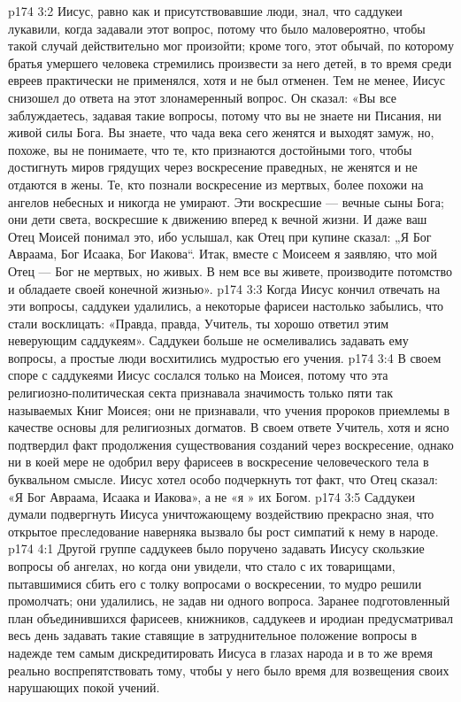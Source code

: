 \vs p174 3:2 Иисус, равно как и присутствовавшие люди, знал, что саддукеи лукавили, когда задавали этот вопрос, потому что было маловероятно, чтобы такой случай действительно мог произойти; кроме того, этот обычай, по которому братья умершего человека стремились произвести за него детей, в то время среди евреев практически не применялся, хотя и не был отменен. Тем не менее, Иисус снизошел до ответа на этот злонамеренный вопрос. Он сказал: «Вы все заблуждаетесь, задавая такие вопросы, потому что вы не знаете ни Писания, ни живой силы Бога. Вы знаете, что чада века сего женятся и выходят замуж, но, похоже, вы не понимаете, что те, кто признаются достойными того, чтобы достигнуть миров грядущих через воскресение праведных, не женятся и не отдаются в жены. Те, кто познали воскресение из мертвых, более похожи на ангелов небесных и никогда не умирают. Эти воскресшие --- вечные сыны Бога; они дети света, воскресшие к движению вперед к вечной жизни. И даже ваш Отец Моисей понимал это, ибо услышал, как Отец при купине сказал: „Я  Бог Авраама, Бог Исаака, Бог Иакова“. Итак, вместе с Моисеем я заявляю, что мой Отец --- Бог не мертвых, но живых. В нем все вы живете, производите потомство и обладаете своей конечной жизнью».
\vs p174 3:3 Когда Иисус кончил отвечать на эти вопросы, саддукеи удалились, а некоторые фарисеи настолько забылись, что стали восклицать: «Правда, правда, Учитель, ты хорошо ответил этим неверующим саддукеям». Саддукеи больше не осмеливались задавать ему вопросы, а простые люди восхитились мудростью его учения.
\vs p174 3:4 \pc В своем споре с саддукеями Иисус сослался только на Моисея, потому что эта религиозно\hyp{}политическая секта признавала значимость только пяти так называемых Книг Моисея; они не признавали, что учения пророков приемлемы в качестве основы для религиозных догматов. В своем ответе Учитель, хотя и ясно подтвердил факт продолжения существования созданий через воскресение, однако ни в коей мере не одобрил веру фарисеев в воскресение человеческого тела в буквальном смысле. Иисус хотел особо подчеркнуть тот факт, что Отец сказал: «Я  Бог Авраама, Исаака и Иакова», а не «я  » их Богом.
\vs p174 3:5 Саддукеи думали подвергнуть Иисуса уничтожающему воздействию  прекрасно зная, что открытое преследование наверняка вызвало бы рост симпатий к нему в народе.
\vs p174 4:1 Другой группе саддукеев было поручено задавать Иисусу скользкие вопросы об ангелах, но когда они увидели, что стало с их товарищами, пытавшимися сбить его с толку вопросами о воскресении, то мудро решили промолчать; они удалились, не задав ни одного вопроса. Заранее подготовленный план объединившихся фарисеев, книжников, саддукеев и иродиан предусматривал весь день задавать такие ставящие в затруднительное положение вопросы в надежде тем самым дискредитировать Иисуса в глазах народа и в то же время реально воспрепятствовать тому, чтобы у него было время для возвещения своих нарушающих покой учений.
